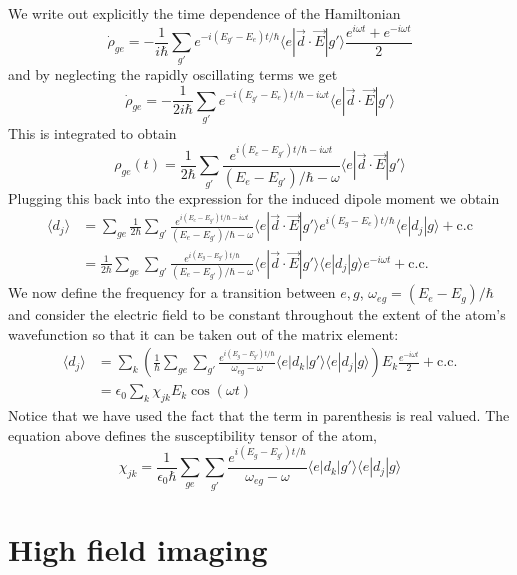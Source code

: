 \documentclass{article}[12pt]
\begin{document}
We write out explicitly the time dependence of the Hamiltonian
\[ \dot{\rho}_{ge} = -  \frac{1}{i\hbar } \sum_{g'} e^{-i(E_{g'}-E_{e})t/\hbar} \langle e |\vec{d}\cdot\vec{E} | g' \rangle \frac{ e^{i\omega t} + e^{-i\omega t}}{2} \]
and by neglecting the rapidly oscillating terms we get
\[ \dot{\rho}_{ge} = - \frac{1}{2i\hbar } \sum_{g'} e^{-i(E_{g'}-E_{e})t/\hbar-i\omega t} \langle e |\vec{d}\cdot\vec{E} | g' \rangle  \]
This is integrated to obtain
\[ \rho_{ge}(t) =   \frac{1}{2\hbar } \sum_{g'} \frac{e^{i(E_{e}-E_{g'})t/\hbar-i\omega t}}{(E_{e} -E_{g'})/\hbar -\omega   } \langle e |\vec{d}\cdot\vec{E} | g' \rangle  \]
Plugging this back into the expression for the induced dipole moment we obtain
\begin{align}  
\langle d_{j} \rangle & = \sum_{ge}   \frac{1}{2\hbar } \sum_{g'} \frac{e^{i(E_{e}-E_{g'})t/\hbar-i\omega t}}{(E_{e} -E_{g'})/\hbar -\omega   } \langle e |\vec{d}\cdot\vec{E} | g' \rangle  e^{i(E_{g}-E_{e})t/\hbar} \langle e | d_{j} | g \rangle + \mathrm{c.c} \\
& = \frac{1}{2\hbar } \sum_{ge}    \sum_{g'} \frac{e^{i(E_{g}-E_{g'})t/\hbar}}{(E_{e} -E_{g'})/\hbar -\omega   } \langle e |\vec{d}\cdot\vec{E} | g' \rangle   \langle e | d_{j} | g \rangle e^{-i\omega t}  + \mathrm{c.c.} 
\end{align}
We now define the frequency for a transition between $e,g$,  $\omega_{eg} = (E_{e}-E_{g})/\hbar$ and consider the electric field to be constant throughout the extent of the atom's wavefunction so that it can be taken out of the matrix element:
\begin{align}  
\langle d_{j} \rangle & = \sum_{k} \left( \frac{1}{\hbar } \sum_{ge}    \sum_{g'} \frac{e^{i(E_{g}-E_{g'})t/\hbar}}{\omega_{eg} -\omega   } \langle e | d_{k} | g' \rangle   \langle e | d_{j} | g \rangle \right) E_{k} \frac{e^{-i\omega t}}{2}   + \mathrm{c.c.}   \\
& = \epsilon_{0} \sum_{k} \chi_{jk} E_{k} \cos(\omega t)
\end{align}
Notice that we have used the fact that the term in parenthesis is real valued.  The equation above defines the susceptibility tensor of the atom,
\[ \chi_{jk} = \frac{1}{\epsilon_{0}\hbar } \sum_{ge}    \sum_{g'} \frac{e^{i(E_{g}-E_{g'})t/\hbar}}{\omega_{eg} -\omega   } \langle e | d_{k} | g' \rangle   \langle e | d_{j} | g \rangle \]


\section{High field imaging}
\end{document}
